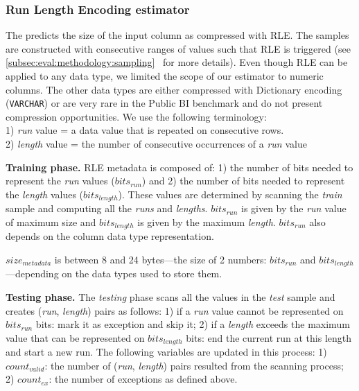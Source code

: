 
\subsubsection{Run Length Encoding estimator}
\label{subsub:estimator:rle}

The  predicts the size of the input column as compressed with RLE. The samples are constructed with consecutive ranges of values such that RLE is triggered (see \ref{subsec:eval:methodology:sampling}~ for more details). Even though RLE can be applied to any data type, we limited the scope of our estimator to numeric columns. The other data types are either compressed with Dictionary encoding (\verb|VARCHAR|) or are very rare in the Public BI benchmark and do not present compression opportunities. We use the following terminology:\\
1) \textit{run} value = a data value that is repeated on consecutive rows.\\
2) \textit{length} value = the number of consecutive occurrences of a \textit{run} value

\textbf{Training phase.} RLE metadata is composed of: 1) the number of bits needed to represent the \textit{run} values (\(bits_{run}\)) and 2) the number of bits needed to represent the \textit{length} values (\(bits_{length}\)). These values are determined by scanning the \textit{train} sample and computing all the \textit{runs} and \textit{lengths}. \(bits_{run}\) is given by the \textit{run} value of maximum size and \(bits_{length}\) is given by the maximum \textit{length}. \(bits_{run}\) also depends on the column data type representation.

\(size_{metadata}\) is between 8 and 24 bytes---the size of 2 numbers: \(bits_{run}\) and \(bits_{length}\)---depending on the data types used to store them.

\textbf{Testing phase.} The \textit{testing} phase scans all the values in the \textit{test} sample and creates (\textit{run}, \textit{length}) pairs as follows: 1) if a \textit{run} value cannot be represented on \(bits_{run}\) bits: mark it as exception and skip it; 2) if a \textit{length} exceeds the maximum value that can be represented on \(bits_{length}\) bits: end the current run at this length and start a new run. The following variables are updated in this process: 1) \(count_{valid}\): the number of (\textit{run}, \textit{length}) pairs resulted from the scanning process; 2) \(count_{ex}\): the number of exceptions as defined above.

